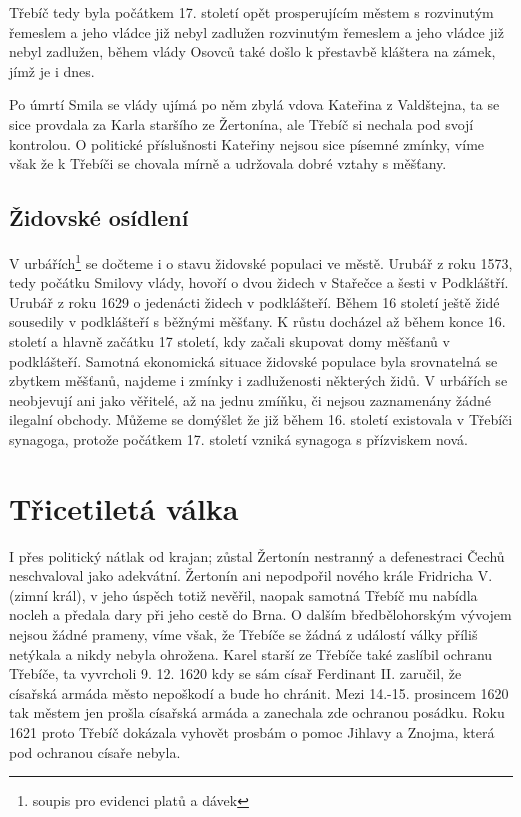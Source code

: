 \documentclass[a4paper,oneside,12p]{report}
\begin{document}
Třebíč tedy byla počátkem 17. století opět prosperujícím městem s rozvinutým řemeslem a jeho vládce již nebyl zadlužen rozvinutým řemeslem a jeho vládce již nebyl zadlužen, během vlády Osovců také došlo k přestavbě kláštera na zámek, jímž je i dnes. %

Po úmrtí Smila se vlády ujímá po něm zbylá vdova Kateřina z Valdštejna, ta se sice provdala za Karla staršího ze Žertonína, ale Třebíč si nechala pod svojí kontrolou.
O politické příslušnosti Kateřiny nejsou sice písemné zmínky, víme však že k Třebíči se chovala mírně a udržovala dobré vztahy s měšťany. %

\subsection{Židovské osídlení}

V urbářích\footnote{soupis pro evidenci platů a dávek} se dočteme i o stavu židovské populaci ve městě.
Urubář z roku 1573, tedy počátku Smilovy vlády, hovoří o dvou židech v Stařečce a šesti v Podkláštří.
Urubář z roku 1629 o jedenácti židech v podklášteří.
Během 16 století ještě židé sousedily v podklášteří s běžnými měšťany.
K růstu docházel až během konce 16. století a hlavně začátku 17 století, kdy začali skupovat domy měšťanů v podklášteří.
Samotná ekonomická situace židovské populace byla srovnatelná se zbytkem měšťanů, najdeme i zmínky i zadluženosti některých židů.
V urbářích se neobjevují ani jako věřitelé, až na jednu zmíňku, či nejsou zaznamenány žádné ilegalní obchody.
Můžeme se domýšlet že již během 16. století existovala v Třebíči synagoga, protože počátkem 17. století vzniká synagoga s přízviskem nová. %

\section{Třicetiletá válka}

I přes politický nátlak od krajan; zůstal Žertonín nestranný a defenestraci Čechů neschvaloval jako adekvátní.
Žertonín ani nepodpořil nového krále Fridricha V. (zimní král), v jeho úspěch totiž nevěřil, naopak samotná Třebíč mu nabídla nocleh a předala dary při jeho cestě do Brna.
O dalším bředbělohorským vývojem nejsou žádné prameny, víme však, že Třebíče se žádná z událostí války příliš netýkala a  nikdy nebyla ohrožena.
Karel starší ze Třebíče také zaslíbil ochranu Třebíče, ta vyvrcholi 9. 12. 1620 kdy se sám císař Ferdinant II. zaručil, že císařská armáda město nepoškodí a bude ho chránit.
Mezi 14.-15. prosincem 1620 tak městem jen prošla císařská armáda a zanechala zde ochranou posádku.
Roku 1621 proto Třebíč dokázala vyhovět prosbám o pomoc Jihlavy a Znojma, která pod ochranou císaře nebyla. %
\end{document}
